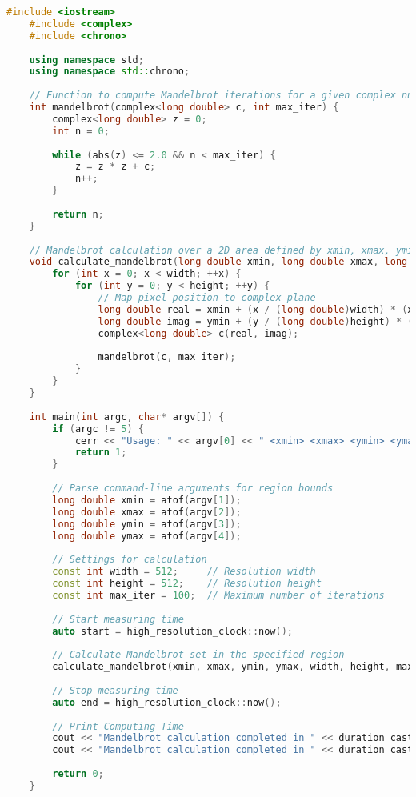 \begin{lstlisting}[language=C++, frame=tb, caption={Mandelbrot Set Calculation}]
    #include <iostream>
    #include <complex>
    #include <chrono>
    
    using namespace std;
    using namespace std::chrono;
    
    // Function to compute Mandelbrot iterations for a given complex number
    int mandelbrot(complex<long double> c, int max_iter) {
        complex<long double> z = 0;
        int n = 0;
    
        while (abs(z) <= 2.0 && n < max_iter) {
            z = z * z + c;
            n++;
        }
    
        return n;
    }
    
    // Mandelbrot calculation over a 2D area defined by xmin, xmax, ymin, ymax
    void calculate_mandelbrot(long double xmin, long double xmax, long double ymin, long double ymax, int width, int height, int max_iter) {
        for (int x = 0; x < width; ++x) {
            for (int y = 0; y < height; ++y) {
                // Map pixel position to complex plane
                long double real = xmin + (x / (long double)width) * (xmax - xmin);
                long double imag = ymin + (y / (long double)height) * (ymax - ymin);
                complex<long double> c(real, imag);
    
                mandelbrot(c, max_iter);
            }
        }
    }
    
    int main(int argc, char* argv[]) {
        if (argc != 5) {
            cerr << "Usage: " << argv[0] << " <xmin> <xmax> <ymin> <ymax>" << endl;
            return 1;
        }
    
        // Parse command-line arguments for region bounds
        long double xmin = atof(argv[1]);
        long double xmax = atof(argv[2]);
        long double ymin = atof(argv[3]);
        long double ymax = atof(argv[4]);
    
        // Settings for calculation
        const int width = 512;     // Resolution width
        const int height = 512;    // Resolution height
        const int max_iter = 100;  // Maximum number of iterations
    
        // Start measuring time
        auto start = high_resolution_clock::now();
    
        // Calculate Mandelbrot set in the specified region
        calculate_mandelbrot(xmin, xmax, ymin, ymax, width, height, max_iter);
    
        // Stop measuring time
        auto end = high_resolution_clock::now();
    
        // Print Computing Time
        cout << "Mandelbrot calculation completed in " << duration_cast<milliseconds>(end - start).count() << "[ms]" << endl;
        cout << "Mandelbrot calculation completed in " << duration_cast<seconds>(end - start).count() << "[s]" << endl;
    
        return 0;
    }
\end{lstlisting}

